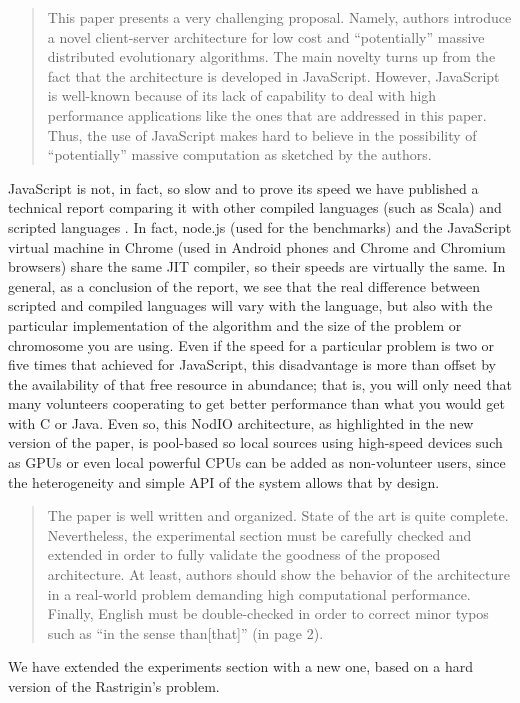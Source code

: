 \documentclass[preprint]{elsarticle}
\begin{document}
\begin{quote}
This paper presents a very challenging proposal. Namely, authors introduce a novel client-server
architecture for low cost and ``potentially'' massive distributed evolutionary algorithms. The main novelty
turns up from the fact that the architecture is developed in JavaScript.
However, JavaScript is well-known because of its lack of capability to deal with high performance
applications like the ones that are addressed in this paper. Thus, the use of JavaScript makes hard to
believe in the possibility of ``potentially'' massive computation as
sketched by the authors.
\end{quote}

JavaScript is not, in fact, so slow and to prove its speed we have
published a technical report comparing it with other compiled
languages (such as Scala) and scripted languages
\cite{2015arXiv151101088M}. In fact, node.js (used for the benchmarks)
and the JavaScript virtual machine in Chrome (used in Android phones
and Chrome and Chromium browsers) share the same JIT compiler, so
their speeds are virtually the same. In general, as a conclusion of
the report, we see that the real difference between scripted and
compiled languages will vary with the language, but also with the
particular implementation of the algorithm and the size of the problem
or chromosome you are using. Even if the speed for a particular
problem is two or five times that achieved for JavaScript, this
disadvantage is more than offset by the availability of that free
resource in abundance; that is, you will only need that many
volunteers cooperating to get better performance than what you would
get with C or Java. Even so, this NodIO architecture, as highlighted
in the new version of the paper, is pool-based so local sources using
high-speed devices such as GPUs or even local powerful CPUs can be
added as non-volunteer users, since the heterogeneity and simple API
of the system allows that by design. 

\begin{quote}
The paper is well written and organized. State of the art is quite complete. Nevertheless, the experimental
section must be carefully checked and extended in order to fully validate the goodness of the proposed
architecture. At least, authors should show the behavior of the architecture in a real-world problem
demanding high computational performance.
Finally, English must be double-checked in order to correct minor typos such as ``in the sense than[that]''
(in page 2).
\end{quote}

We have extended the experiments section with a new one, based on a
hard version of the Rastrigin's problem. 



\end{document}
